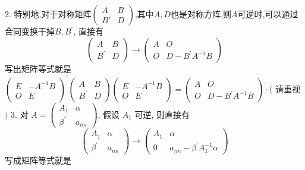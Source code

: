 \documentclass{article}
\begin{document}
2. 特别地,对于对称矩阵$\left(\begin{array}{cc}
            A  & B \\
            B' & D
        \end{array}\right)$,其中$A,D$也是对称方阵,则$A$可逆时,可以通过合同变换干掉$B, B^{\prime}$, 直接有
\begin{equation*}
    \left(\begin{array}{cc}
        A          & B \\
        B^{\prime} & D
    \end{array}\right) \longrightarrow\left(\begin{array}{cc}
        A & O                     \\
        O & D-B^{\prime} A^{-1} B
    \end{array}\right)
\end{equation*}
写出矩阵等式就是
$\left(\begin{array}{cc}E & -A^{-1} B \\ O & E\end{array}\right)^{\prime}\left(\begin{array}{cc}A & B \\ B^{\prime} & D\end{array}\right)\left(\begin{array}{cc}E & -A^{-1} B \\ O & E\end{array}\right)=\left(\begin{array}{cc}A & O \\ O & D-B^{\prime} A^{-1} B\end{array}\right) \cdot($ 请重视 $)$
3. 对 $A=\left(\begin{array}{cc}A_{1} & \alpha \\ \beta^{\prime} & a_{n n}\end{array}\right)$, 假设 $A_{1}$ 可逆, 则直接有
\begin{equation*}
    \left(\begin{array}{cc}
        A_{1}          & \alpha  \\
        \beta^{\prime} & a_{n n}
    \end{array}\right) \longrightarrow\left(\begin{array}{cc}
        A_{1} & \alpha                                   \\
        0     & a_{n n}-\beta^{\prime} A_{1}^{-1} \alpha
    \end{array}\right)
\end{equation*}
写成矩阵等式就是
\end{document}
